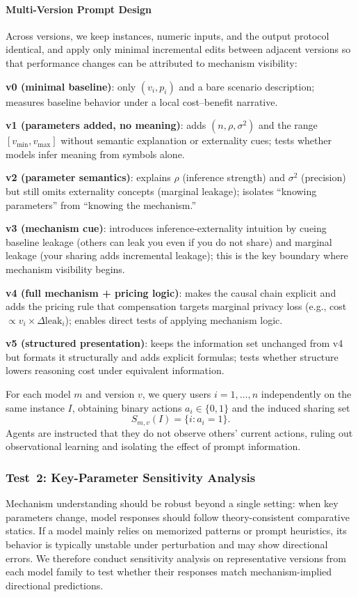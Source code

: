 \documentclass[sigconf,anonymous,review]{acmart}
\theoremstyle{definition}
\begin{document}
\paragraph{\textbf{Multi-Version Prompt Design}}
Across versions, we keep instances, numeric inputs, and the output protocol identical, and apply only minimal incremental edits between adjacent versions so that performance changes can be attributed to mechanism visibility:

\textbf{v0 (minimal baseline)}: only $(v_i,p_i)$ and a bare scenario description; measures baseline behavior under a local cost--benefit narrative.

\textbf{v1 (parameters added, no meaning)}: adds $(n,\rho,\sigma^2)$ and the range $[v_{\min},v_{\max}]$ without semantic explanation or externality cues; tests whether models infer meaning from symbols alone.

\textbf{v2 (parameter semantics)}: explains $\rho$ (inference strength) and $\sigma^2$ (precision) but still omits externality concepts (marginal leakage); isolates ``knowing parameters'' from ``knowing the mechanism.''

\textbf{v3 (mechanism cue)}: introduces inference-externality intuition by cueing baseline leakage (others can leak you even if you do not share) and marginal leakage (your sharing adds incremental leakage); this is the key boundary where mechanism visibility begins.

\textbf{v4 (full mechanism + pricing logic)}: makes the causal chain explicit and adds the pricing rule that compensation targets marginal privacy loss (e.g., cost $\propto v_i \times \Delta \mathrm{leak}_i$); enables direct tests of applying mechanism logic.

\textbf{v5 (structured presentation)}: keeps the information set unchanged from v4 but formats it structurally and adds explicit formulas; tests whether structure lowers reasoning cost under equivalent information.

For each model $m$ and version $v$, we query users $i=1,\ldots,n$ independently on the same instance $I$, obtaining binary actions $a_i\in\{0,1\}$ and the induced sharing set
\[
S_{m,v}(I)=\{i: a_i=1\}.
\]
Agents are instructed that they do not observe others' current actions, ruling out observational learning and isolating the effect of prompt information.


\subsubsection{\textbf{Test~2: Key-Parameter Sensitivity Analysis}}
\label{subsubsec:rq2}
Mechanism understanding should be robust beyond a single setting: when key parameters change, model responses should follow theory-consistent comparative statics. If a model mainly relies on memorized patterns or prompt heuristics, its behavior is typically unstable under perturbation and may show directional errors. We therefore conduct sensitivity analysis on representative versions from each model family to test whether their responses match mechanism-implied directional predictions.
\end{document}
